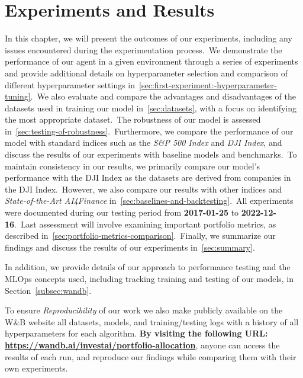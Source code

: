 \documentclass[../xlapes02]{subfiles}
\begin{document}
    \chapter{Experiments and Results}\label{ch:experiments-and-results}
    In this chapter, we will present the outcomes of our experiments, including any issues encountered during the experimentation process.\ We demonstrate the performance of our agent in a given environment through a series of experiments and provide additional details on hyperparameter selection and comparison of different hyperparameter settings in~\cref{sec:first-experiment:-hyperparameter-tuning}.\ We also evaluate and compare the advantages and disadvantages of the datasets used in training our model in~\ref{sec:datasets}, with a focus on identifying the most appropriate dataset.\ The robustness of our model is assessed in~\ref{sec:testing-of-robustness}.\ Furthermore, we compare the performance of our model with standard indices such as the \emph{S\&P 500 Index} and \emph{DJI Index}, and discuss the results of our experiments with baseline models and benchmarks.\ To maintain consistency in our results, we primarily compare our model's performance with the DJI Index as the datasets are derived from companies in the DJI Index.\ However, we also compare our results with other indices and \emph{State-of-the-Art AI4Finance} in~\ref{sec:baselines-and-backtesting}.\ All experiments were documented during our testing period from \textbf{2017-01-25} to \textbf{2022-12-16}.\ Last assessment will involve examining important portfolio metrics, as described in~\cref{sec:portfolio-metrics-comparison}.\ Finally, we summarize our findings and discuss the results of our experiments in~\ref{sec:summary}.

    In addition, we provide details of our approach to performance testing and the MLOps concepts used, including tracking training and testing of our models, in Section~\ref{subsec:wandb}.

    To ensure \emph{Reproducibility} of our work we also make publicly available on the W\&B website all datasets, models, and training/testing logs with a history of all hyperparameters for each algorithm. \textbf{By visiting the following URL: \url{https://wandb.ai/investai/portfolio-allocation}}, anyone can access the results of each run, and reproduce our findings while comparing them with their own experiments.
\end{document}
